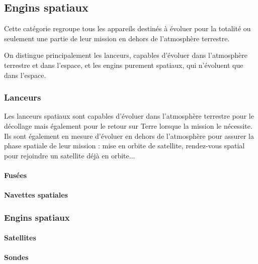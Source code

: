 \begin{center}
\begin{minipage}[c]{1.0\linewidth}
\begin{figure}[H]
\begin{minipage}[c]{0.5\linewidth}
	\end{minipage}
	\end{figure}
	\end{minipage}
	\end{center}
	
	
\subsection{Engins spatiaux}
	Cette catégorie regroupe tous les appareils destinés à évoluer pour la totalité ou seulement une partie de leur mission en dehors de l'atmosphère terrestre.
	
	On distingue principalement les lanceurs, capables d'évoluer dans l'atmosphère terrestre et dans l'espace, et les engins purement spatiaux, qui n'évoluent que dans l'espace.

	\subsubsection{Lanceurs}
	Les lanceurs spatiaux sont capables d'évoluer dans l'atmosphère terrestre pour le décollage mais également pour le retour sur Terre lorsque la mission le nécessite. Ils sont également en mesure d'évoluer en dehors de l'atmosphère pour assurer la phase spatiale de leur mission : mise en orbite de satellite, rendez-vous spatial pour rejoindre un satellite déjà en orbite...
	
		\paragraph{Fusées}
		\paragraph{Navettes spatiales}
		
	\subsubsection{Engins spatiaux}
		\paragraph{Satellites}
		\paragraph{Sondes}

